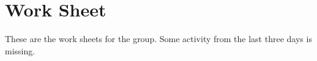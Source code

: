 
\chapter{Work Sheet}
\label{chap:WorkSheet}

These are the work sheets for the group. Some activity from the last three days is missing.

